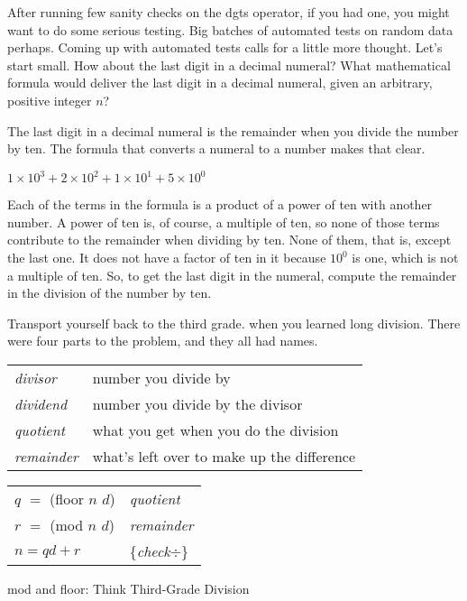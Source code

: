 After running few sanity checks on the dgts operator, 
if you had one, you might want to do some serious testing.
Big batches of automated tests on random data perhaps.
Coming up with automated tests calls for a little more thought.
Let's start small. How about the last digit in a decimal numeral?
What mathematical formula would deliver the last digit in a
decimal numeral, given an arbitrary, positive integer $n$?

The last digit in a decimal numeral is the remainder when you divide
the number by ten. The formula that converts a numeral to a number
makes that clear.
\begin{center}
$1 \times 10^3 + 2 \times 10^2 + 1 \times 10^1 + 5 \times 10^0$
\end{center}

Each of the terms in the formula is a product of a power
of ten with another number. A power of ten is, of course,
a multiple of ten, so none of those terms contribute to the remainder
when dividing by ten. None of them, that is, except the last one.
It does not have a factor of ten in it because 
$10^0$ is one, which is not a multiple of ten.
So, to get the last digit in the numeral, 
compute the remainder in the division of the number by ten.

\begin{aside}
Transport yourself back to the third grade.
when you learned long division.
There were four parts to the problem,
and they all had names.

\begin{tabular}{ll}
\emph{divisor}   & number you divide by \\
\emph{dividend}  & number you divide by the divisor \\
\emph{quotient}  & what you get when you do the division \\
\emph{remainder} & what's left over to make up the difference
\end{tabular}
\begin{center}
\begin{tabular}{ll}
$q$ $=$ (floor $n$ $d$) & \emph{quotient}  \\
$r$ $=$ (mod $n$ $d$)   & \emph{remainder} \\
$n = qd + r$            & \{\emph{check}$\div$\} \\
\end{tabular}
\end{center}
\caption{mod and floor: Think Third-Grade Division}
\label{third-grade-division}
\end{aside}

